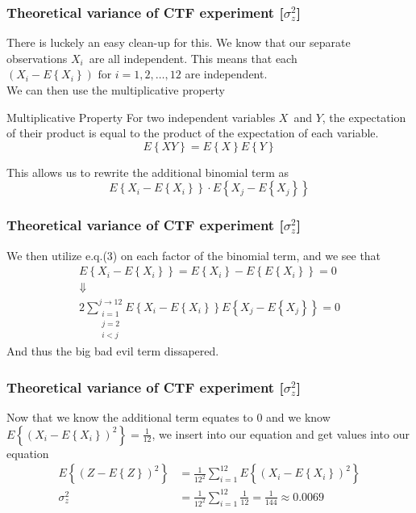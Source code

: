 \documentclass[compress]{beamer}
\newcommand{\E}[1]{\ensuremath{E\left\{#1\right\}}}
\begin{document}
\begin{frame}
    \frametitle{Theoretical variance of CTF experiment [$\sigma_z^2$]}
    There is luckely an easy clean-up for this. We know that our separate 
    observations $X_i$ are all independent. This means that each
    $\left(X_i-\E{X_i}\right) \text{ for } i=1,2,\dots,12$ are independent. \\
    \pause
    We can then use the multiplicative property
    \begin{alertblock}{Multiplicative Property}
        For two independent variables $X$ and $Y$, the expectation of their
        product is equal to the product of the expectation of each variable.
        \begin{equation*}
            \E{XY} = \E{X}\E{Y}
        \end{equation*}
    \end{alertblock}
    \pause
    This allows us to rewrite the additional binomial term as
    \begin{equation*}
        \E{X_i-\E{X_i}}\cdot\E{X_j-\E{X_j}}
    \end{equation*}
\end{frame} 

\begin{frame}
    \frametitle{Theoretical variance of CTF experiment [$\sigma_z^2$]}
    We then utilize e.q.(3) on each factor of the binomial term,
    and we see that 
    \begin{gather*}
        \E{X_i-\E{X_i}} = \E{X_i}-\E{\E{X_i}}  =  0 \\
        \Downarrow \\
        2 \sum^{j\rightarrow12}_{\substack{i=1\\j=2\\i<j}}
        { \E{X_i-\E{X_i}}\E{X_j-\E{X_j}}} = 0
    \end{gather*}
    And thus the big bad evil term dissapered.
\end{frame}

\begin{frame}
    \frametitle{Theoretical variance of CTF experiment [$\sigma_z^2$]}
    Now that we know the additional term equates to 0 and we know
    $\E{\left(X_i - \E{X_i}\right)^2}=\frac{1}{12}$, we insert into our
    equation and get
    values into our equation
    \begin{align*}
        \E{\left(Z-\E{Z}\right)^2} 
        & = \frac{1}{12^2}\sum^{12}_{i=1}
        {\E{\left(X_i - \E{X_i}\right)^2}} \\
        \sigma_z^2  & = \frac{1}{12^2}\sum^{12}_{i=1}
        {\frac{1}{12}} = \frac{1}{144} \approx 0.0069
    \end{align*}
\end{frame}
\end{document}
